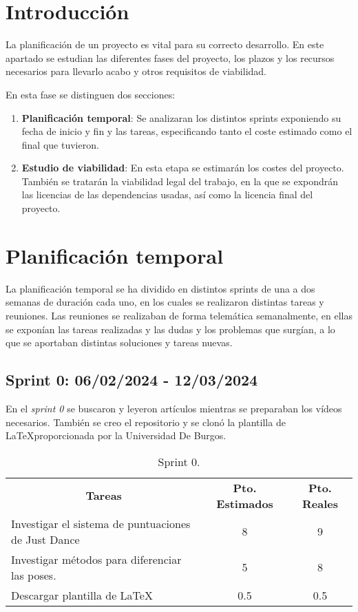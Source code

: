 
\section{Introducción}
La planificación de un proyecto es vital para su correcto desarrollo. En este apartado se estudian las diferentes fases del proyecto, los plazos y los recursos necesarios para llevarlo acabo y otros requisitos de viabilidad.

En esta fase se distinguen dos secciones:
\begin{enumerate}
	\item \textbf{Planificación temporal}: Se analizaran los distintos sprints exponiendo su fecha de inicio y fin y las tareas, especificando tanto el coste estimado como el final que tuvieron.
	
	\item \textbf{Estudio de viabilidad}: En esta etapa se estimarán los costes del proyecto. También se tratarán la viabilidad legal del trabajo, en la que se expondrán las licencias de las dependencias usadas, así como la licencia final del proyecto. 
\end{enumerate}

\section{Planificación temporal}
La planificación temporal se ha dividido en distintos sprints de una a dos semanas de duración cada uno, en los cuales se realizaron distintas tareas y reuniones. Las reuniones se realizaban de forma telemática semanalmente, en ellas se exponían las tareas realizadas y las dudas y los problemas que surgían, a lo que se aportaban distintas soluciones y tareas nuevas.
\subsection{Sprint 0: 06/02/2024 - 12/03/2024}
En el \textit{sprint 0} se buscaron y leyeron artículos mientras se preparaban los vídeos necesarios. También se creo el repositorio y se clonó la plantilla de \LaTeX proporcionada por la Universidad De Burgos.

\begin{table}[H]
	\centering
	\begin{tabular}{lcc}
		\multicolumn{1}{c}{\textbf{Tareas}} & \textbf{Pto. Estimados} & \textbf{Pto. Reales}\\
		Investigar el sistema de puntuaciones de Just Dance & 8 & 9 \\
	 	Investigar métodos para diferenciar las poses. & 5 & 8 \\
	 	Descargar plantilla de \LaTeX & 0.5 & 0.5 \\
	\end{tabular}
\caption{Sprint 0.}
\label{sprint0}
\end{table}

